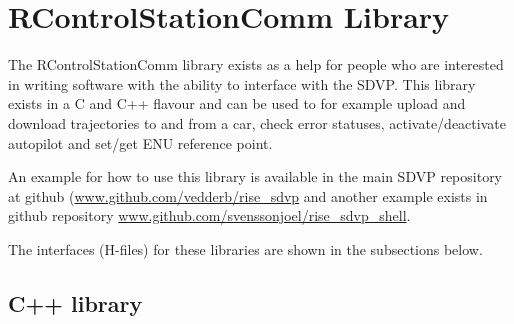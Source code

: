 \documentclass[12pt]{article} %
\def\printtodos{0}
\newcommand{\todo}[1]{
  \if\printtodos1
      {\color{red} \textbf{TODO:} #1}
  \fi}
\begin{document}



\section{RControlStationComm Library}\label{sec:comm}

The RControlStationComm library exists as a help for people who are
interested in writing software with the ability to interface with the
SDVP. This library exists in a C and C++ flavour and can be used to
for example upload and download trajectories to and from a car, check
error statuses, activate/deactivate autopilot and set/get ENU
reference point.

An example for how to use this library is available in the main SDVP
repository at github (\url{www.github.com/vedderb/rise_sdvp} and
another example exists in github repository
\url{www.github.com/svenssonjoel/rise_sdvp_shell}.

The interfaces (H-files) for these libraries are shown in the subsections below.

\subsection{C++ library}
\end{document}
